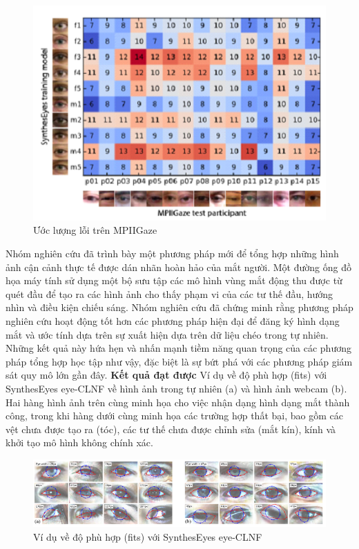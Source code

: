 \begin{center}
    \begin{figure}[h!]
    \begin{center}
     \includegraphics[scale=0.5]{img/Estimation_of_errors_on_MPIIGaze.png}
    \end{center}
    \caption{Ước lượng lỗi trên MPIIGaze}
    \label{refhinh20}
    \end{figure}
\end{center}
Nhóm nghiên cứu đã trình bày một phương pháp mới để tổng hợp những hình ảnh cận cảnh thực tế được dán nhãn hoàn hảo của mắt người. Một đường ống đồ họa máy tính sử dụng một bộ sưu tập các mô hình vùng mắt động thu được từ quét đầu để tạo ra các hình ảnh cho thấy phạm vi của các tư thế đầu, hướng nhìn và điều kiện chiếu sáng. Nhóm nghiên cứu đã chứng minh rằng phương pháp nghiên cứu hoạt động tốt hơn các phương pháp hiện đại để đăng ký hình dạng mắt và ước tính dựa trên sự xuất hiện dựa trên dữ liệu chéo trong tự nhiên. Những kết quả này hứa hẹn và nhấn mạnh tiềm năng quan trọng của các phương pháp tổng hợp học tập như vậy, đặc biệt là sự bứt phá với các phương pháp giám sát quy mô lớn gần đây.
\textbf{Kết quả đạt được}
Ví dụ về độ phù hợp (fits) với SynthesEyes eye-CLNF về hình ảnh trong tự nhiên (a) và hình ảnh webcam (b). Hai hàng hình ảnh trên cùng minh họa cho việc nhận dạng hình dạng mắt thành công, trong khi hàng dưới cùng minh họa các trường hợp thất bại, bao gồm các vệt chưa được tạo ra (tóc), các tư thế chưa được chỉnh sửa (mắt kín), kính và khởi tạo mô hình không chính xác.
\begin{center}
    \begin{figure}[h!]
    \begin{center}
     \includegraphics[scale=0.75]{img/Example_fits_of_our_SynthesEyes_eye_CLNF.png}
    \end{center}
    \caption{Ví dụ về độ phù hợp (fits) với SynthesEyes eye-CLNF}
    \label{refhinh20}
    \end{figure}
\end{center}
